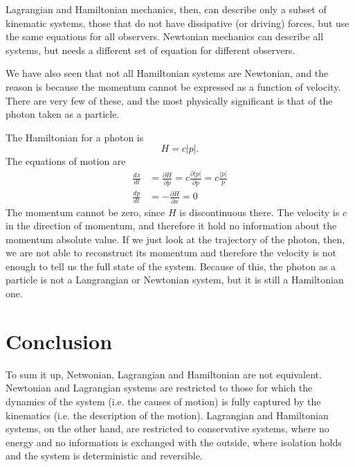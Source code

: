 \documentclass[11pt]{article}
\begin{document}
Lagrangian and Hamiltonian mechanics, then, can describe only a subset of kinematic systems, those that do not have dissipative (or driving) forces, but use the same equations for all observers. Newtonian mechanics can describe all systems, but needs a different set of equation for different observers.

We have also seen that not all Hamiltonian systems are Newtonian, and the reason is because the momentum cannot be expressed as a function of velocity. There are very few of these, and the most physically significant is that of the photon taken as a particle. 

The Hamiltonian for a photon is
\begin{equation*}
H = c|p|.
\end{equation*}
The equations of motion are
\begin{align*}
\frac{dx}{dt} &= \frac{\partial H}{\partial p} = c \frac{\partial |p|}{\partial p} = c \frac{|p|}{p} \\
\frac{dp}{dt} &= - \frac{\partial H}{\partial x} = 0
\end{align*}
The momentum cannot be zero, since $H$ is discontinuous there. The velocity is $c$ in the direction of momentum, and therefore it hold no information about the momentum absolute value. If we just look at the trajectory of the photon, then, we are not able to reconstruct its momentum and therefore the velocity is not enough to tell us the full state of the system. Because of this, the photon as a particle is not a Langrangian or Newtonian system, but it is still a Hamiltonian one.

\section{Conclusion}

To sum it up, Netwonian, Lagrangian and Hamiltonian are not equivalent. Newtonian and Lagrangian systems are restricted to those for which the dynamics of the system (i.e. the causes of motion) is fully captured by the kinematics (i.e. the description of the motion). Lagrangian and Hamiltonian systems, on the other hand, are restricted to conservative systems, where no energy and no information is exchanged with the outside, where isolation holds and the system is deterministic and reversible.
\end{document}
